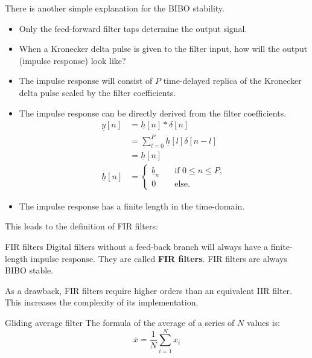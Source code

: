 \begin{refsection}
There is another simple explanation for the \ac{BIBO} stability.
\begin{itemize}
	\item Only the feed-forward filter taps determine the output signal.
	\item When a Kronecker delta pulse is given to the filter input, how will the output (impulse response) look like?
	\item The impulse response will consist of $P$ time-delayed replica of the Kronecker delta pulse scaled by the filter coefficients.
	\item The impulse response can be directly derived from the filter coefficients.
	\begin{equation}
		\begin{split}
			\underline{y}[n] &= \underline{h}[n] * \delta[n] \\
			 &= \sum\limits_{l=0}^{P} \underline{h}[l] \delta[n - l] \\
			 &= \underline{h}[n] \\
			\underline{h}[n] &= \begin{cases}
			 	\underline{b}_n &\quad \text{if } 0 \leq n \leq P, \\
			 	0 &\quad \text{else}.
			 \end{cases}
		\end{split}
		\label{eq:ch06:fir_ir}
	\end{equation}
	\item The impulse response has a finite length in the time-domain.
\end{itemize}

This leads to the definition of \ac{FIR} filters:

\begin{definition}{\ac{FIR} filters}
	Digital filters without a feed-back branch will always have a finite-length impulse response. They are called  \textbf{\acf{FIR} filters}. \ac{FIR} filters are always \ac{BIBO} stable.
\end{definition}

As a drawback, \ac{FIR} filters require higher orders than an equivalent \ac{IIR} filter. This increases the complexity of its implementation.

\begin{example}{Gliding average filter}
	The formula of the average of a series of $N$ values is:
	\begin{equation}
		\overline{x} = \frac{1}{N} \sum\limits_{i=1}^{N} x_i
	\end{equation}
	

\end{example}
\end{refsection}

